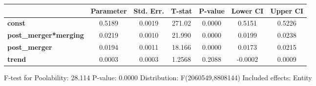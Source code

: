 \documentclass{report}a
\begin{document}
\begin{center}
\begin{tabular}{lcccccc}
                              & \textbf{Parameter} & \textbf{Std. Err.} & \textbf{T-stat} & \textbf{P-value} & \textbf{Lower CI} & \textbf{Upper CI}  \\
\midrule
\textbf{const}                &       0.5189       &       0.0019       &      271.02     &      0.0000      &       0.5151      &       0.5226       \\
\textbf{post\_merger*merging} &       0.0219       &       0.0010       &      21.990     &      0.0000      &       0.0199      &       0.0238       \\
\textbf{post\_merger}         &       0.0194       &       0.0011       &      18.166     &      0.0000      &       0.0173      &       0.0215       \\
\textbf{trend}                &       0.0003       &       0.0003       &      1.2568     &      0.2088      &      -0.0002      &       0.0009       \\
\bottomrule
\end{tabular}
\end{center}

F-test for Poolability: 28.114 \newline
 P-value: 0.0000 \newline
 Distribution: F(2060549,8808144) \newline
  \newline
 Included effects: Entity
\end{document}
